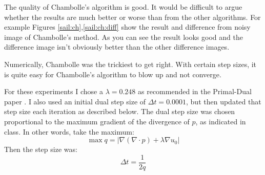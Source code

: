\documentclass[11pt]{article}
\begin{document}
The quality of Chambolle's algorithm is good.  
It would be difficult to argue whether the results are much better or worse than from the other algorithms. 
For example Figures \ref{sail:ch},\ref{sail:ch:diff} show the result and difference from noisy image of Chambolle's method.  As you can see the result looks good and the difference image isn't obviously better than the other difference images.

Numerically, Chambolle was the trickiest to get right.
With certain step sizes, it is quite easy for Chambolle's algorithm to blow up and not converge.

For these experiments I chose a $\lambda=0.248$ as recommended in the Primal-Dual paper \cite{zhu2008efficient}.
I also used an initial dual step size of $\Delta t = 0.0001$, but then updated that step size each iteration as described below.
The dual step size was chosen proportional to the maximum gradient of the divergence of $p$, as indicated in class.
In other words, take the maximum:
\begin{equation*}
\max q = |\nabla(\nabla \cdot p) + \lambda \nabla u_0|
\end{equation*}
Then the step size was:
\begin{equation*}
\Delta t = \frac{1}{2q}
\end{equation*}
\end{document}
